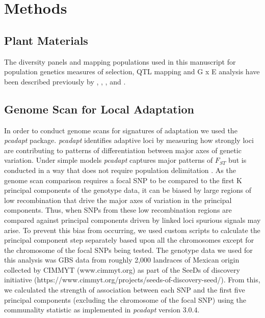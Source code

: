 \section{Methods}

\subsection{Plant Materials}
The diversity panels and mapping populations used in this manuscript for population genetics measures of selection, QTL mapping and G x E analysis have been described previously by \citep{Wang2020-mp}, \citep{Gates2019-xu}, \citep{Romero_Navarro2017-cn}, \citep{Janzen2021-lz} and \citep{Perez-Limon2022-lg}. 

\subsection{Genome Scan for Local Adaptation}
In order to conduct genome scans for signatures of adaptation we used the \textit{pcadapt} \citep{Luu2017-ws} package.
\textit{pcadapt} identifies adaptive loci by measuring how strongly loci are contributing to patterns of differentiation between major axes of genetic variation.
Under simple models \textit{pcadapt} captures major patterns of $F_{ST}$  but is conducted in a way that does not require population delimitation \citep{duforet2014genome}.
As the genome scan comparison requires a focal SNP to be compared to the first K principal components of the genotype data, it can be biased by large regions of low recombination that drive the major axes of variation in the principal components.
Thus, when SNPs from these low recombination regions are compared against principal components driven by linked loci spurious signals may arise.
To prevent this bias from occurring, we used custom scripts to calculate the principal component step separately based upon all the chromosomes except for the chromosome of the focal SNPs being tested.
The genotype data we used for this analysis was GBS data from roughly 2,000 landraces of Mexican origin collected by CIMMYT (www.cimmyt.org) as part of the SeeDs of discovery initiative (https://www.cimmyt.org/projects/seeds-of-discovery-seed/).
From this, we calculated the strength of association between each SNP and the first five principal components (excluding the chromosome of the focal SNP) using the communality statistic as implemented in \textit{pcadapt} version 3.0.4.


